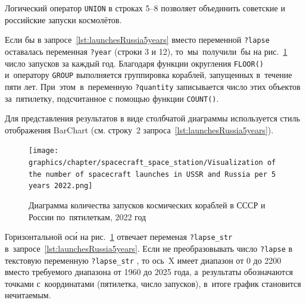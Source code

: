 Логический оператор \lstinline|UNION| в строках 5--8 
позволяет объединить советские и российские запуски космолётов. 

Если бы в запросе~\ref{lst:launchesRussia5years} 
вместо переменной \lstinline|?lapse| оставалась переменная \lstinline|?year| (строки 3 и 12), 
то~мы~получили~бы на рис.~\ref{fig:launchesRussia5years} 
число запусков за каждый год. 
Благодаря функции округления \mbox{\lstinline|FLOOR()|} 
и~оператору \lstinline|GROUP| выполняется группировка%
%
 кораблей, запущенных в~течение пяти лет. 
При~этом~в~переменную \mbox{\lstinline|?quantity|} записывается число этих объектов за~пятилетку, 
подсчитанное с помощью функции \lstinline|COUNT()|.

Для представления результатов в виде столбчатой диаграммы используется стиль отображения BarChart 
(см. строку~2 запроса~\ref{lst:launchesRussia5years}).




\begin{figure}[h!]
    \texttt{[image: graphics/chapter/spacecraft\_space\_station/Visualization of the number of spacecraft launches in USSR and Russia per 5 years 2022.png]}
    \caption[График запусков космических кораблей в СССР и России, 2022 год.]
            {Диаграмма количества запусков космических кораблей в СССР и России по~пятилеткам, 2022 год}
    \label{fig:launchesRussia5years}%
\end{figure}



\newpage\phantom{blabla}

Горизонтальной ос\'{и} на рис.~\ref{fig:launchesRussia5years} 
отвечает переменая \mbox{\lstinline|?lapse_str|} в~запросе~\ref{lst:launchesRussia5years}. 
Если не преобразовывать число \lstinline|?lapse| 
в текстовую переменную \mbox{\lstinline|?lapse_str|}%
, то ось~X имеет диапазон от 0 до 2200 
вместо требуемого диапазона от 1960 до 2025 года, 
а~результаты обозначаются точками с~координатами (пятилетка, число запусков), 
в~итоге график становится нечитаемым. 

